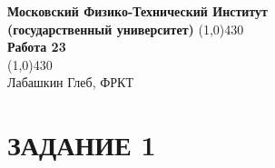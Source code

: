\documentclass[a4paper, 12pt]{article}%
\begin{document}
\begin{titlepage}

\begin{center}
\large\textbf{Московский Физико-Технический Институт}\\
\large\textbf{(государственный университет)}
\vfill
\line(1,0){430}\\[1mm]
\huge\textbf{Работа 23}\\
\line(1,0){430}\\[1mm]
\vfill
\large Лабашкин Глеб, ФРКТ\\
\end{center}

\end{titlepage}

\section*{ЗАДАНИЕ 1}
\end{document}
